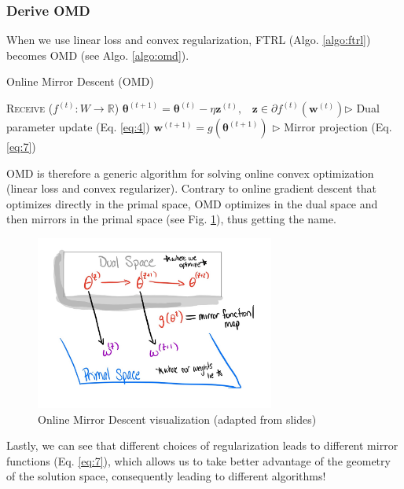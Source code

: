 \documentclass[11pt]{article}
\begin{document}
\subsubsection{Derive OMD}
When we use linear loss and convex regularization, FTRL (Algo. \ref{algo:ftrl}) becomes OMD (see Algo. \ref{algo:omd}). 

\begin{algorithm}[H]
\caption{Online Mirror Descent (OMD)}
\label{algo:omd}
\begin{algorithmic}[1]
\STATE \textsc{Receive} ($f^{(t)}: W \rightarrow \mathbb{R}$)
\STATE $\bm\theta^{(t+1)} = \bm\theta^{(t)} - \eta \textbf{z}^{(t)}, \;\;\; \textbf{z} \in \partial f^{(t)}(\textbf{w}^{(t)}) $\hfill $\triangleright$ Dual parameter update (Eq. \ref{eq:4})
\STATE $\textbf{w}^{(t+1)} = g(\bm\theta^{(t+1)})$ \hfill $\triangleright$ Mirror projection (Eq. \ref{eq:7})
\ENDFOR
\end{algorithmic}
\end{algorithm}

OMD is therefore a generic algorithm for solving online convex optimization (linear loss and convex regularizer). Contrary to online gradient descent that optimizes directly in the primal space, OMD optimizes in the dual space and then mirrors in the primal space (see Fig. \ref{fig:omd}), thus getting the name.

\begin{figure}[H]
    \centering
    \includegraphics[width=0.7\textwidth]{figs/Page1.jpg}
    \caption{Online Mirror Descent visualization (adapted from slides)}
    \label{fig:omd}
\end{figure}

Lastly, we can see that different choices of regularization leads to different mirror functions (Eq. \ref{eq:7}), which allows us to take better advantage of the geometry of the solution space, consequently leading to different algorithms!
\end{document}

